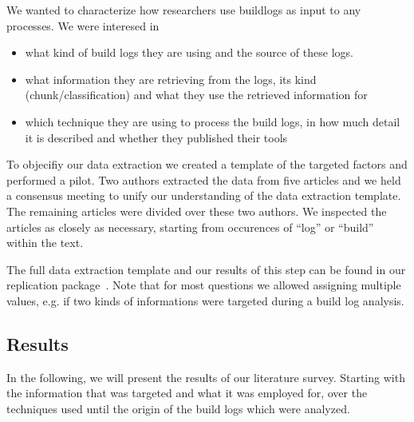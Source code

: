 We wanted to characterize how researchers use buildlogs as input to
any processes.
We were interesed in
\begin{itemize}
  \item what kind of build logs they are using and the source of these
  logs.
  \item what information they are retrieving from the logs,
  its kind (chunk/classification) and
  what they use the retrieved information for
  \item which technique they are using to process the build logs,
  in how much detail it is described and whether they published their
  tools
\end{itemize}
To objecifiy our data extraction we created a template of the targeted
factors and performed a pilot.
Two authors extracted the data from five articles and we held a
consensus meeting to unify our understanding
of the data extraction template.
The remaining articles were divided over these two authors.
We inspected the articles as closely as necessary,
starting from occurences of ``log'' or ``build'' within the text.

The full data extraction template and our results of this step can be
found in our replication package~\cite{brandt2020chunk-replication}.
Note that for most questions we allowed assigning multiple values, e.g.
if
two kinds of informations were targeted during a build log analysis.

\subsection{Results}
In the following, we will present the results of our literature survey.
Starting with the information that was targeted and what it was employed
for, over the techniques used until the origin of the build logs
which were
analyzed.


